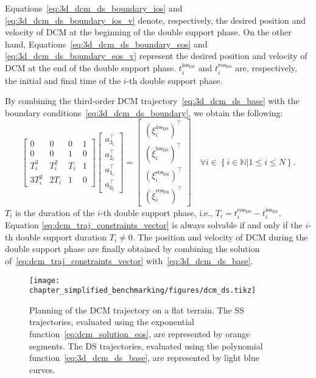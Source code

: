 Equations~\eqref{eq:3d_dcm_ds_boundary_ios} and \eqref{eq:3d_dcm_ds_boundary_ios_v} denote, respectively, the desired position and velocity of DCM at the beginning of the double support phase. On the other hand, Equations~\eqref{eq:3d_dcm_ds_boundary_eos} and \eqref{eq:3d_dcm_ds_boundary_eos_v} represent
the desired position and velocity of DCM at the end of the double support phase. $t^{\text{ios}_\text{DS}}_i$ and
$t^{\text{eos}_{\text{DS}}}_i$ are, respectively, the initial and final time of the $i$-th double support phase.
\par
By combining the third-order DCM trajectory~\eqref{eq:3d_dcm_ds_base} with the boundary conditions~\eqref{eq:3d_dcm_ds_boundary}, we obtain the following:
\begin{equation}
  \label{eq:dcm_traj_constraints_vector}
  \begin{bmatrix}
    0 & 0 & 0 & 1 \\
    0 & 0 & 1 & 0 \\
    T_i^3 & T_i^2 & T_i & 1 \\
  3T_i^2 & 2T_i & 1 & 0
  \end{bmatrix}
  \begin{bmatrix}
    {a}_{3_i} ^\top\\
    {a}_{2_i} ^\top\\
    {a}_{1_i} ^\top\\
  {a}_{0_i} ^\top
  \end{bmatrix}
  =
  \begin{bmatrix}
    ({\xi}^{\text{ios}_\text{DS}}_i ) ^\top\\
    (\dot{{\xi}}^{\text{ios}_\text{DS}}_i) ^\top\\
    ({\xi}^{\text{eos}_{\text{DS}}}_i) ^\top\\
    (\dot{{\xi}}^{\text{eos}_{\text{DS}}}_i)^\top
  \end{bmatrix}
  \quad \forall i \in \left\{i \in \mathbb{N} | 1\leq i \leq N \right \}.
\end{equation}
$T_i$ is the duration of the $i$-th double support phase, i.e., $T_i = t^{\text{eos}_\text{DS}}_i - t^{\text{ios}_{\text{DS}}}_i$.
Equation \eqref{eq:dcm_traj_constraints_vector} is always solvable if and only if the $i$-th double
support duration $T_i \neq 0$. 
The position and velocity of DCM during the double support phase are finally obtained by combining the solution of~\eqref{eq:dcm_traj_constraints_vector} with~\eqref{eq:3d_dcm_ds_base}.
\par
\begin{figure}[t]
  \centering
  \texttt{[image: chapter\_simplified\_benchmarking/figures/dcm\_ds.tikz]}
    \caption[DCM trajectory planning]{Planning of the DCM trajectory on a flat terrain.
    The SS trajectories, evaluated using the exponential
    function~\eqref{eq:dcm_solution_eos},
    are represented by orange segments. The DS trajectories, evaluated using the polynomial function~\eqref{eq:3d_dcm_ds_base},
    are represented by light blue curves. \label{fig:dcm_ds}}
\end{figure}
